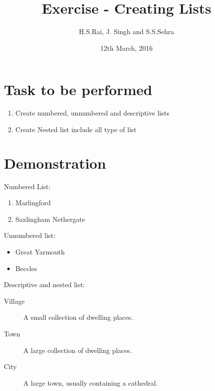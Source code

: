 \documentclass[12pt]{article}
\title{Exercise  - Creating Lists }
\author{H.S.Rai, J. Singh and S.S.Sehra}
\date{12th March, 2016}
\begin{document}
	\maketitle
	\section*{Task to be performed}
	\begin{enumerate}
		\item Create numbered, unnumbered and descriptive lists
		\item Create Nested list include all type of list
	\end{enumerate}
\section*{Demonstration}	
Numbered List:
	
\begin{enumerate}
	   	
\item Marlingford
   	
\item Saxlingham Nethergate
	   	
\end{enumerate}

Unnumbered list:
\begin{itemize}
\item Great Yarmouth
\item Beccles
\end{itemize}

Descriptive and nested list:
\begin{description}

  \item[Village] A small collection of dwelling places. 
   \item[Town] A large collection of dwelling places.    
  \item[City] A large town, usually containing a cathedral.  
\end{description}
\end{document}

